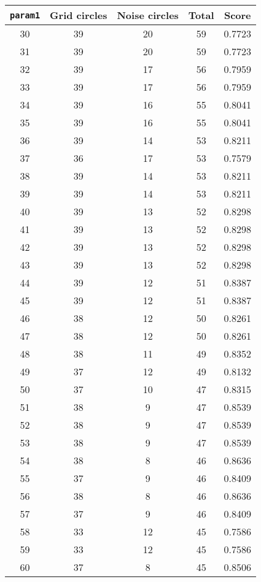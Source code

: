 \documentclass[letterpaper, 12pt]{article}
\begin{document}
\begin{longtable}{|c|c|c|c|c|}
\hline
\textbf{\texttt{param1}} & \textbf{Grid circles} & \textbf{Noise circles} & \textbf{Total} & \textbf{Score} \\
\hline
30 & 39 & 20 & 59 & 0.7723 \\
\hline
31 & 39 & 20 & 59 & 0.7723 \\
\hline
32 & 39 & 17 & 56 & 0.7959 \\
\hline
33 & 39 & 17 & 56 & 0.7959 \\
\hline
34 & 39 & 16 & 55 & 0.8041 \\
\hline
35 & 39 & 16 & 55 & 0.8041 \\
\hline
36 & 39 & 14 & 53 & 0.8211 \\
\hline
37 & 36 & 17 & 53 & 0.7579 \\
\hline
38 & 39 & 14 & 53 & 0.8211 \\
\hline
39 & 39 & 14 & 53 & 0.8211 \\
\hline
40 & 39 & 13 & 52 & 0.8298 \\
\hline
41 & 39 & 13 & 52 & 0.8298 \\
\hline
42 & 39 & 13 & 52 & 0.8298 \\
\hline
43 & 39 & 13 & 52 & 0.8298 \\
\hline
44 & 39 & 12 & 51 & 0.8387 \\
\hline
45 & 39 & 12 & 51 & 0.8387 \\
\hline
46 & 38 & 12 & 50 & 0.8261 \\
\hline
47 & 38 & 12 & 50 & 0.8261 \\
\hline
48 & 38 & 11 & 49 & 0.8352 \\
\hline
49 & 37 & 12 & 49 & 0.8132 \\
\hline
50 & 37 & 10 & 47 & 0.8315 \\
\hline
51 & 38 & 9 & 47 & 0.8539 \\
\hline
52 & 38 & 9 & 47 & 0.8539 \\
\hline
53 & 38 & 9 & 47 & 0.8539 \\
\hline
54 & 38 & 8 & 46 & 0.8636 \\
\hline
55 & 37 & 9 & 46 & 0.8409 \\
\hline
56 & 38 & 8 & 46 & 0.8636 \\
\hline
57 & 37 & 9 & 46 & 0.8409 \\
\hline
58 & 33 & 12 & 45 & 0.7586 \\
\hline
59 & 33 & 12 & 45 & 0.7586 \\
\hline
60 & 37 & 8 & 45 & 0.8506 \\

\end{longtable}
\end{document}
